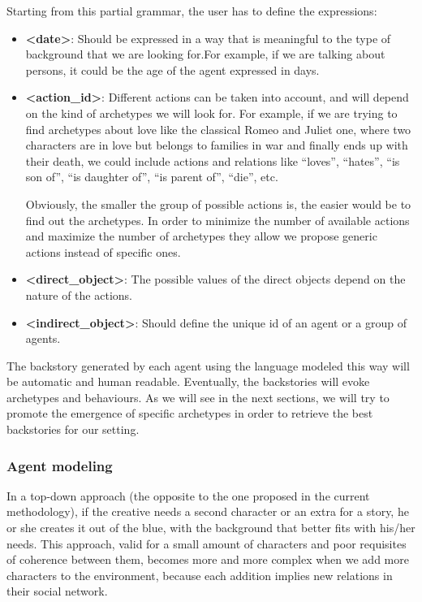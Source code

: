 \documentclass[letterpaper]{article}
\begin{document}
Starting from this partial grammar, the user has to define the expressions:
\begin{itemize}
\item \textbf{<date>}: Should be expressed in a way that is meaningful to the type of background that we are looking for.For example, if we are talking about persons, it could be the age of the agent expressed in days.

\item \textbf{<action\_id>}: Different actions can be taken into account, and will depend on the kind of archetypes we will look for. For example, if we are trying to find archetypes about love like the classical Romeo and Juliet one, where two characters are in love but belongs to families in war and finally ends up with their death, we could include actions and relations like ``loves'', ``hates'', ``is son of'', ``is daughter of'', ``is parent of'', ``die'', etc.

Obviously, the smaller the group of possible actions is, the easier would be to find out the archetypes. In order to minimize the number of available actions and maximize the number of archetypes they allow we propose generic actions instead of specific ones.

\item \textbf{<direct\_object>}: The possible values of the direct objects depend on the nature of the actions.

\item \textbf{<indirect\_object>}: Should define the unique id of an agent or a group of agents.

\end{itemize}

The backstory generated by each agent using the language modeled this way will be automatic and human readable. Eventually, the backstories will evoke archetypes and behaviours. As we will see in the next sections, we will try to promote the emergence of specific archetypes in order to retrieve the best backstories for our setting.



\subsubsection{Agent modeling}


In a top-down approach (the opposite to the one proposed in the current methodology), if the creative needs a second character or an extra for a story, he or she creates it out of the blue, with the background that better fits with his/her needs. This approach, valid for a small amount of characters and poor requisites of coherence between them, becomes more and more complex when we add more characters to the environment, because each addition implies new relations in their social network.
\end{document}
